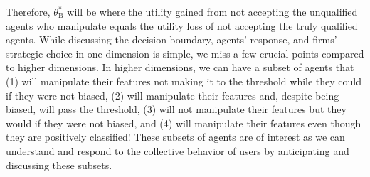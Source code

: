 Therefore, $\theta^*_\text{B}$ will be where the utility gained from not accepting the unqualified agents who manipulate equals the utility loss of not accepting the truly qualified agents. While discussing the decision boundary, agents' response, and firms' strategic choice in one dimension is simple, we miss a few crucial points compared to higher dimensions. In higher dimensions, we can have a subset of agents that (1) will manipulate their features not making it to the threshold while they could if they were not biased, (2) will manipulate their features and, despite being biased, will pass the threshold, (3) will not manipulate their features but they would if they were not biased, and (4) will manipulate their features even though they are positively classified! These subsets of agents are of interest as we can understand and respond to the collective behavior of users by anticipating and discussing these subsets. 




